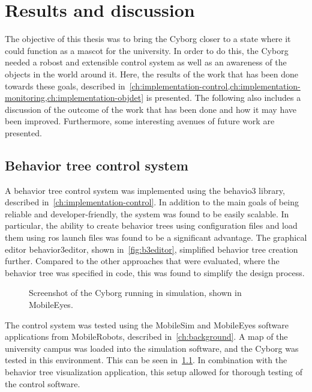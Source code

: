 \documentclass[\rootfolder/main.tex]{subfiles}
\begin{document}
\chapter{Results and discussion}
\label{ch:results} %

The objective of this thesis was to bring the Cyborg closer to a state where it could function as a mascot for the university.
In order to do this, the Cyborg needed a robost and extensible control system as well as an awareness of the objects in the world around it.
Here, the results of the work that has been done towards these goals, described in~\cref{ch:implementation-control,ch:implementation-monitoring,ch:implementation-objdet} is presented.
The following also includes a discussion of the outcome of the work that has been done and how it may have been improved.
Furthermore, some interesting avenues of future work are presented.


\section{Behavior tree control system}

A behavior tree control system was implemented using the behavio3 library, described in~\cref{ch:implementation-control}.
In addition to the main goals of being reliable and developer-friendly, the system was found to be easily scalable.
In particular, the ability to create behavior trees using configuration files and load them using \acrshort{ros} launch files was found to be a significant advantage.
The graphical editor behavior3editor, shown in~\cref{fig:b3editor}, simplified behavior tree creation further.
Compared to the other approaches that were evaluated, where the behavior tree was specified in code, this was found to simplify the design process.

\begin{figure}[h]
    \caption{Screenshot of the Cyborg running in simulation, shown in MobileEyes.}
    \label{fig:mobileeyes}
\end{figure}

The control system was tested using the MobileSim and MobileEyes software applications from MobileRobots, described in~\cref{ch:background}.
A map of the university campus was loaded into the simulation software, and the Cyborg was tested in this environment.
This can be seen in~\cref{fig:mobileeyes}.
In combination with the behavior tree visualization application, this setup allowed for thorough testing of the control software.
\end{document}
